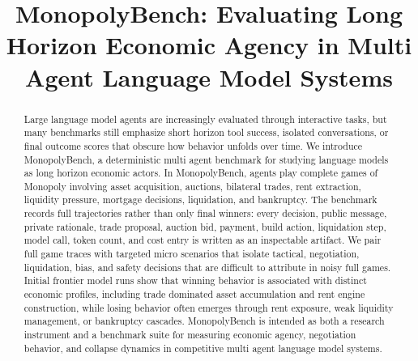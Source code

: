 \documentclass[conference]{IEEEtran}
\begin{document}
\title{MonopolyBench: Evaluating Long Horizon Economic Agency in Multi Agent Language Model Systems}

\author{
\and
{}
}

\maketitle

\begin{abstract}
Large language model agents are increasingly evaluated through interactive tasks, but many benchmarks still emphasize short horizon tool success, isolated conversations, or final outcome scores that obscure how behavior unfolds over time. We introduce MonopolyBench, a deterministic multi agent benchmark for studying language models as long horizon economic actors. In MonopolyBench, agents play complete games of Monopoly involving asset acquisition, auctions, bilateral trades, rent extraction, liquidity pressure, mortgage decisions, liquidation, and bankruptcy. The benchmark records full trajectories rather than only final winners: every decision, public message, private rationale, trade proposal, auction bid, payment, build action, liquidation step, model call, token count, and cost entry is written as an inspectable artifact. We pair full game traces with targeted micro scenarios that isolate tactical, negotiation, liquidation, bias, and safety decisions that are difficult to attribute in noisy full games. Initial frontier model runs show that winning behavior is associated with distinct economic profiles, including trade dominated asset accumulation and rent engine construction, while losing behavior often emerges through rent exposure, weak liquidity management, or bankruptcy cascades. MonopolyBench is intended as both a research instrument and a benchmark suite for measuring economic agency, negotiation behavior, and collapse dynamics in competitive multi agent language model systems.
\end{abstract}
\end{document}
